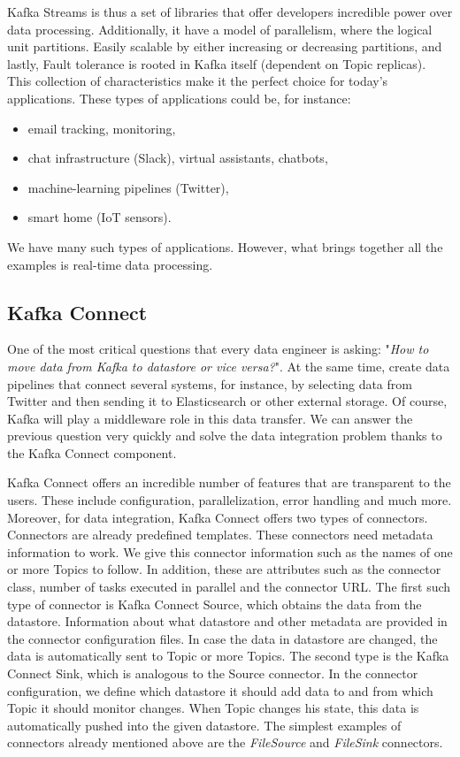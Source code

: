 Kafka Streams is thus a set of libraries that offer developers incredible power over data processing. Additionally, it have a model of parallelism, where the logical unit partitions. Easily scalable by either increasing or decreasing partitions, and lastly, Fault tolerance is rooted in Kafka itself (dependent on Topic replicas). This collection of characteristics make it the perfect choice for today's applications. These types of applications could be, for instance:
\begin{itemize}[itemsep=1mm, parsep=0pt]
    \item email tracking, monitoring,
    \item chat infrastructure (Slack), virtual assistants, chatbots,
    \item machine-learning pipelines (Twitter),
    \item smart home (IoT sensors).
\end{itemize}
We have many such types of applications. However, what brings together all the examples is real-time data processing.	

\subsection{Kafka Connect}

One of the most critical questions that every data engineer is asking: "\emph{How to move data from Kafka to datastore or vice versa?}". At the same time, create data pipelines that connect several systems, for instance, by selecting data from Twitter and then sending it to Elasticsearch or other external storage. Of course, Kafka will play a middleware role in this data transfer. We can answer the previous question very quickly and solve the data integration problem thanks to the Kafka Connect component.

Kafka Connect offers an incredible number of features that are transparent to the users. These include configuration, parallelization, error handling and much more. Moreover, for data integration, Kafka Connect offers two types of connectors. Connectors are already predefined templates. These connectors need metadata information to work. We give this connector information such as the names of one or more Topics to follow. In addition, these are attributes such as the connector class, number of tasks executed in parallel and the connector URL. The first such type of connector is Kafka Connect Source, which obtains the data from the datastore. Information about what datastore and other metadata are provided in the connector configuration files. In case the data in datastore are changed, the data is automatically sent to Topic or more Topics. The second type is the Kafka Connect Sink, which is analogous to the Source connector. In the connector configuration, we define which datastore it should add data to and from which Topic it should monitor changes. When Topic changes his state, this data is automatically pushed into the given datastore. The simplest examples of connectors already mentioned above are the \emph{FileSource} and \emph{FileSink} connectors.

